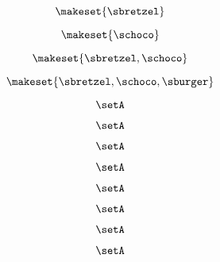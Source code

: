 {\begin{forslides}
    \begin{equation}
        \label{eq:combination-156}
        \makeset{ \sbretzel }
    \end{equation}

    \begin{equation}
        \label{eq:combination-157}
        \makeset{ \schoco }
    \end{equation}

    \begin{equation}
        \label{eq:combination-158}
        \makeset{ \sbretzel, \schoco }
    \end{equation}

    \begin{equation}
        \label{eq:combination-159}
        \makeset{ \sbretzel, \schoco, \sburger }
    \end{equation}

    \begin{equation}
        \label{eq:combination-160}
        \setA
    \end{equation}

    \begin{equation}
        \label{eq:combination-161}
        \setA
    \end{equation}

    \begin{equation}
        \label{eq:combination-162}
        \setA
    \end{equation}

    \begin{equation}
        \label{eq:combination-163}
        \setA
    \end{equation}

    \begin{equation}
        \label{eq:combination-164}
        \setA
    \end{equation}

    \begin{equation}
        \label{eq:combination-165}
        \setA
    \end{equation}

    \begin{equation}
        \label{eq:combination-166}
        \setA
    \end{equation}

    \begin{equation}
        \label{eq:combination-167}
        \setA
    \end{equation}


\end{forslides}}
